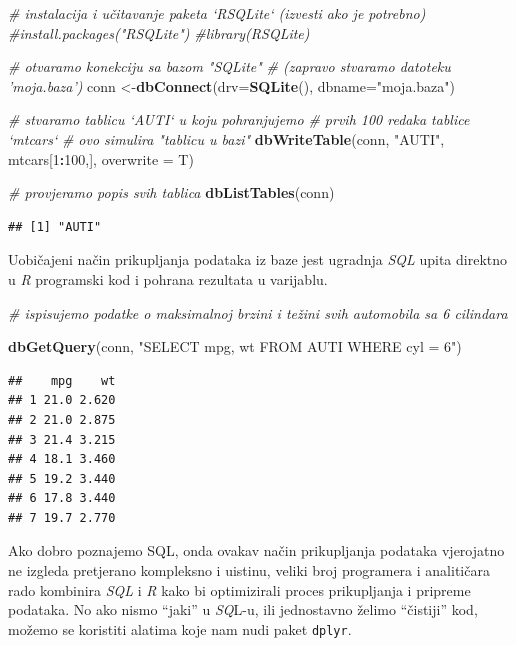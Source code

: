 \documentclass[]{book}
\newenvironment{Shaded}{\begin{snugshade}}{\end{snugshade}}
\newcommand{\KeywordTok}[1]{\textcolor[rgb]{0.13,0.29,0.53}{\textbf{#1}}}
\newcommand{\DataTypeTok}[1]{\textcolor[rgb]{0.13,0.29,0.53}{#1}}
\newcommand{\DecValTok}[1]{\textcolor[rgb]{0.00,0.00,0.81}{#1}}
\newcommand{\StringTok}[1]{\textcolor[rgb]{0.31,0.60,0.02}{#1}}
\newcommand{\CommentTok}[1]{\textcolor[rgb]{0.56,0.35,0.01}{\textit{#1}}}
\newcommand{\OperatorTok}[1]{\textcolor[rgb]{0.81,0.36,0.00}{\textbf{#1}}}
\newcommand{\NormalTok}[1]{#1}
\theoremstyle{definition}
\theoremstyle{definition}
\theoremstyle{definition}
\theoremstyle{remark}
\begin{document}
\begin{Shaded}
\begin{Highlighting}[]
\CommentTok{# instalacija i učitavanje paketa `RSQLite` (izvesti ako je potrebno)}
\CommentTok{#install.packages("RSQLite")      }
\CommentTok{#library(RSQLite)                 }

\CommentTok{# otvaramo konekciju sa bazom "SQLite"}
\CommentTok{# (zapravo stvaramo datoteku 'moja.baza')}
\NormalTok{conn <-}\KeywordTok{dbConnect}\NormalTok{(}\DataTypeTok{drv=}\KeywordTok{SQLite}\NormalTok{(), }\DataTypeTok{dbname=}\StringTok{"moja.baza"}\NormalTok{)}

\CommentTok{# stvaramo tablicu `AUTI` u koju pohranjujemo}
\CommentTok{# prvih 100 redaka tablice `mtcars`}
\CommentTok{# ovo simulira "tablicu u bazi"}
\KeywordTok{dbWriteTable}\NormalTok{(conn, }\StringTok{"AUTI"}\NormalTok{, mtcars[}\DecValTok{1}\OperatorTok{:}\DecValTok{100}\NormalTok{,], }\DataTypeTok{overwrite =}\NormalTok{ T)}

\CommentTok{# provjeramo popis svih tablica}
\KeywordTok{dbListTables}\NormalTok{(conn)}
\end{Highlighting}
\end{Shaded}

\begin{verbatim}
## [1] "AUTI"
\end{verbatim}

Uobičajeni način prikupljanja podataka iz baze jest ugradnja \emph{SQL}
upita direktno u \emph{R} programski kod i pohrana rezultata u
varijablu.

\begin{Shaded}
\begin{Highlighting}[]
\CommentTok{# ispisujemo podatke o maksimalnoj brzini i težini svih automobila sa 6 cilindara}

\KeywordTok{dbGetQuery}\NormalTok{(conn, }\StringTok{"SELECT mpg, wt FROM AUTI WHERE cyl = 6"}\NormalTok{)}
\end{Highlighting}
\end{Shaded}

\begin{verbatim}
##    mpg    wt
## 1 21.0 2.620
## 2 21.0 2.875
## 3 21.4 3.215
## 4 18.1 3.460
## 5 19.2 3.440
## 6 17.8 3.440
## 7 19.7 2.770
\end{verbatim}

Ako dobro poznajemo SQL, onda ovakav način prikupljanja podataka
vjerojatno ne izgleda pretjerano kompleksno i uistinu, veliki broj
programera i analitičara rado kombinira \emph{SQL} i \emph{R} kako bi
optimizirali proces prikupljanja i pripreme podataka. No ako nismo
``jaki'' u \emph{SQ}L-u, ili jednostavno želimo ``čistiji'' kod, možemo
se koristiti alatima koje nam nudi paket \texttt{dplyr}.
\end{document}
